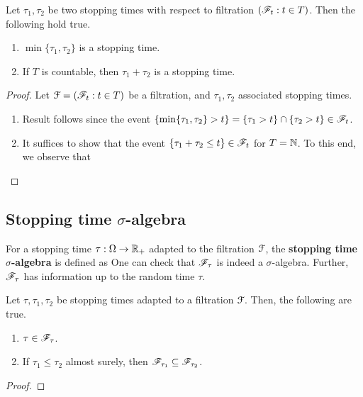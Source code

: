 \documentclass[a4paper,10pt,english]{article}
\begin{document}
\begin{lem}
Let $\tau_1,\tau_2$ be two stopping times with respect to filtration $(\mathscr{F}_t: t \in T)$.  
Then the following hold true. 
\begin{enumerate}[i\_]
\item $\min \{\tau_1,\tau_2\} $ is a stopping time. 
\item If $T$ is countable, then $\tau_1+\tau_2$ is a stopping time.
\end{enumerate}
\end{lem}
\begin{proof}
Let $\mathcal{F} = (\mathscr{F}_t : t \in T)$ be a filtration, and $\tau_1,\tau_2$ associated stopping times. 
\begin{enumerate}[i\_]
\item Result follows since the event $\{ \min \{ \tau_1,\tau_2\} > t\} = \{\tau_1 > t\} \cap \{\tau_2 > t\} \in \mathscr{F}_t$. 
\item It suffices to show that the event $\{\tau_1+\tau_2 \leq  t\} \in \mathscr{F}_t$ for $T = \mathbb{N}$. 
To this end, we observe that 
\end{enumerate}
\end{proof}

\subsection{Stopping time $\sigma$-algebra}

For a stopping time $\tau: \Omega \to \mathbb{R}_+$ adapted to the filtration $\mathcal{F}$, 
the \textbf{stopping time $\sigma$-algebra} is defined as 
One can check that $\mathscr{F}_{\tau}$ is indeed a $\sigma$-algebra. 
Further, $\mathscr{F}_{\tau}$ has information up to the random time $\tau$. 
\begin{lem} 
Let $\tau, \tau_1, \tau_2$ be stopping times adapted to a filtration $\mathcal{F}$. 
Then, the following are true. 
\begin{enumerate}[i\_]
\item $\tau \in \mathscr{F}_{\tau}$.
\item If $\tau_1 \le \tau_2$ almost surely, then $\mathscr{F}_{\tau_1} \subseteq \mathscr{F}_{\tau_2}$. 
\end{enumerate}
\end{lem}
\begin{proof}
\end{proof}
\end{document}
